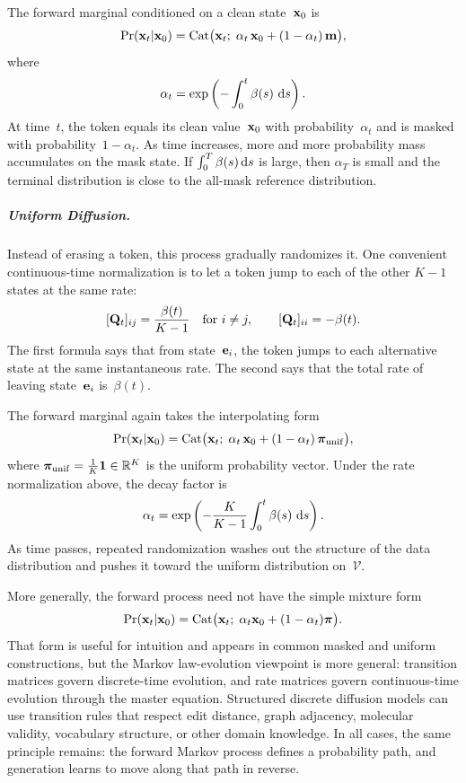       The forward marginal conditioned on a clean state~${\mathbf{x}}_0$ is
      \[
      \Pr({\mathbf{x}}_t | {\mathbf{x}}_0)
      = \mathrm{Cat}\bigl({\mathbf{x}}_t;\;
          \alpha_t\,{\mathbf{x}}_0 + (1-\alpha_t)\,{\mathbf{m}}\bigr),
      \]
      where
      \[
      \alpha_t
      =
      \exp\left(-\int_0^t\beta(s)\,\mathop{}\!\mathrm{d} s\right).
      \]
      At time~$t$, the token equals its clean value~${\mathbf{x}}_0$ with
      probability~$\alpha_t$ and is masked with probability~$1-\alpha_t$.
      As time increases, more and more probability mass accumulates on the
      mask state.  If $\int_0^T\beta(s)\mathop{}\!\mathrm{d} s$ is large, then $\alpha_T$ is small and the terminal distribution is close to the all-mask reference distribution.

\subparagraph{Uniform Diffusion.} Instead of erasing a token, this
      process gradually randomizes it.  One convenient continuous-time normalization is to let a token jump to each of the other $K-1$ states at the same rate:
      \[
      [{\mathbf{Q}}_t]_{ij} = \frac{\beta(t)}{K - 1}
      \quad\text{for } i \neq j,
      \qquad
      [{\mathbf{Q}}_t]_{ii} = -\beta(t).
      \]
      The first formula says that from state~${\mathbf{e}}_i$, the token jumps
      to each alternative state at the same instantaneous rate.  The second says that
      the total rate of leaving state~${\mathbf{e}}_i$ is~$\beta(t)$.

      The forward marginal again takes the interpolating form
      \[
      \Pr({\mathbf{x}}_t|{\mathbf{x}}_0)
      = \mathrm{Cat} \bigl({\mathbf{x}}_t;\;
          \alpha_t\,{\mathbf{x}}_0 + (1-\alpha_t)\,\bm{\pi}_{\mathrm{unif}}
        \bigr),
      \]
      where
      $\bm{\pi}_{\mathrm{unif}}=\tfrac{1}{K}\mathbf{1}\in\mathbb{R}^K$ is the
      uniform probability vector.  Under the rate normalization above,
      the decay factor is
      \[
      \alpha_t
      =
      \exp\left(
      -\frac{K}{K-1}\int_0^t \beta(s)\,\mathop{}\!\mathrm{d} s
      \right).
      \]
      As time passes, repeated randomization washes out the structure of
      the data distribution and pushes it toward the uniform distribution
      on~$\mathcal{V}$.

More generally, the forward process need not have the simple mixture form
\[
\Pr({\mathbf{x}}_t|{\mathbf{x}}_0)
= \mathrm{Cat}\bigl({\mathbf{x}}_t;\;\alpha_t{\mathbf{x}}_0+(1-\alpha_t)\bm{\pi}\bigr).
\]
That form is useful for intuition and appears in common masked and uniform
constructions, but the Markov law-evolution viewpoint is more general:
transition matrices govern discrete-time evolution, and rate matrices govern
continuous-time evolution through the master equation. Structured discrete diffusion models can use transition rules that respect edit distance, graph adjacency, molecular validity, vocabulary structure, or other domain knowledge. In all cases, the same principle remains: the forward Markov process defines a probability path, and generation learns to move along that path in reverse.

